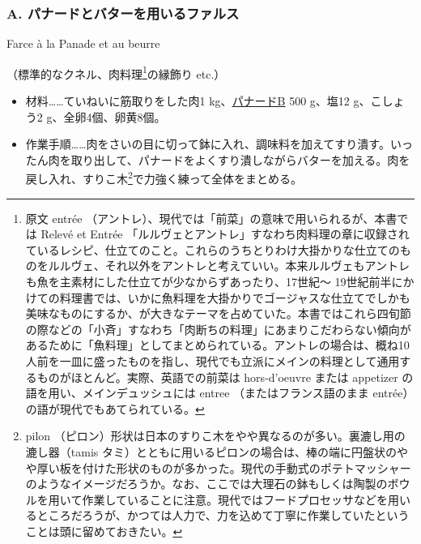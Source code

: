 \begin{recette}

\hypertarget{farce-a}{%
\subsubsection{A. パナードとバターを用いるファルス}\label{farce-a}}

\begin{frsubenv}

Farce à la Panade et au beurre

\end{frsubenv}


（標準的なクネル、肉料理\footnote{原文 entrée
  （アントレ）、現代では「前菜」の意味で用いられるが、本書では Relevé et
  Entrée
  「ルルヴェとアントレ」すなわち肉料理の章に収録されているレシピ、仕立てのこと。これらのうちとりわけ大掛かりな仕立てのものをルルヴェ、それ以外をアントレと考えていい。本来ルルヴェもアントレも魚を主素材にした仕立てが少なからずあったり、17世紀〜
  19世紀前半にかけての料理書では、いかに魚料理を大掛かりでゴージャスな仕立てでしかも美味なものにするか、が大きなテーマを占めていた。本書ではこれら四旬節の際などの「小斉」すなわち「肉断ちの料理」にあまりこだわらない傾向があるために「魚料理」としてまとめられている。アントレの場合は、概ね10人前を一皿に盛ったものを指し、現代でも立派にメインの料理として通用するものがほとんど。実際、英語での前菜は
  hors-d'oeuvre または appetizer の語を用い、メインデュッシュには entree
  （またはフランス語のまま entrée）の語が現代でもあてられている。}の縁飾り
etc.）

\begin{itemize}
\item
  材料\ldots{}\ldots{}ていねいに筋取りをした肉1
  kg、\protect\hyperlink{panade-b}{パナードB} 500 g、塩12 g、こしょう2
  g、全卵4個、卵黄8個。
\item
  作業手順\ldots{}\ldots{}肉をさいの目に切って鉢に入れ、調味料を加えてすり潰す。いったん肉を取り出して、パナードをよくすり潰しながらバターを加える。肉を戻し入れ、すりこ木\footnote{pilon
    （ピロン）形状は日本のすりこ木をやや異なるのが多い。裏漉し用の漉し器（tamis
    タミ）とともに用いるピロンの場合は、棒の端に円盤状のやや厚い板を付けた形状のものが多かった。現代の手動式のポテトマッシャーのようなイメージだろうか。なお、ここでは大理石の鉢もしくは陶製のボウルを用いて作業していることに注意。現代ではフードプロセッサなどを用いるところだろうが、かつては人力で、力を込めて丁寧に作業していたということは頭に留めておきたい。}で力強く練って全体をまとめる。
\end{itemize}


\end{recette}
